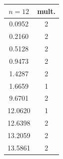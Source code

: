 \documentclass[11pt]{article}
\numberwithin{equation}{section}\newtheorem*{jepEnonce}{\jepEnonceTitle}\newenvironment{enonce*}[1]{\def\jepEnonceTitle{#1}\jepEnonce}{\endjepEnonce}\newtheorem*{conj*}{Conjecture}
\theoremstyle{plain}
\theoremstyle{definition}
\begin{document}
\begin{table}
\begin{minipage}{.2\textwidth}
\begin{tabular}{|c|c|}
\hline
$n = 12$ & mult.\\ \hline
0.0952& 2\\
0.2160& 2\\
0.5128& 2\\
0.9473& 2\\
1.4287& 2\\
1.6659& 1\\
9.6701& 2\\
12.0620& 1\\
12.6398& 2\\
13.2059& 2\\
13.5861& 2\\
\hline
\end{tabular}
\end{minipage}


\end{table}
\end{document}
